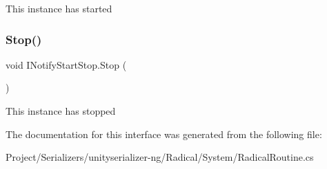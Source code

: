 This instance has started 

\mbox{\label{interface_i_notify_start_stop_aae0b1a45988dd8e4f776036d444667de}} 
\subsubsection{\texorpdfstring{Stop()}{Stop()}}
{\footnotesize\ttfamily void I\+Notify\+Start\+Stop.\+Stop (\begin{DoxyParamCaption}{ }\end{DoxyParamCaption})}



This instance has stopped 



The documentation for this interface was generated from the following file\+:\begin{DoxyCompactItemize}
\item 
Project/\+Serializers/unityserializer-\/ng/\+Radical/\+System/Radical\+Routine.\+cs\end{DoxyCompactItemize}
